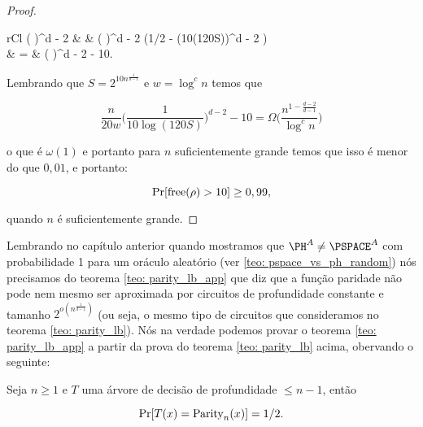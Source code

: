 \begin{proof}
	\begin{IEEEeqnarray*} {rCl}
		 \bigg( \bigg)^{d - 2} & \geq &  \bigg( \bigg)^{d - 2} \bigg(1/2 - (10\log(120S))^{d - 2} \bigg) \\
		                                                                                                                        & =    &  \bigg( \bigg)^{d - 2} - 10.
	\end{IEEEeqnarray*}
	
	Lembrando que $S = 2^{10n^{\frac{1}{d - 1}}}$ e $w = \log^{c}n$ temos que
	
	\begin{equation*}
		\frac{n}{20w} \bigg(\frac{1}{10\log(120S)} \bigg)^{d - 2} - 10 = \Omega \bigg( \frac{n^{1 - \frac{d - 2}{d - 1}}}{\log^{c}n} \bigg)
	\end{equation*}
	
	o que é $\omega(1)$ e portanto para $n$ suficientemente grande temos que isso é menor do que $0,01$, e portanto:
	
	\begin{equation*}
		\Pr[\text{free}(\rho) > 10] \geq 0,99,
	\end{equation*}
	
	quando $n$ é suficientemente grande.
	
\end{proof}

Lembrando no capítulo anterior quando mostramos que $\PH^{A} \neq \PSPACE^{A}$ com probabilidade 1 para um oráculo aleatório (ver \ref{teo: pspace_vs_ph_random}) nós precisamos do teorema \ref{teo: parity_lb_app} que diz que a função paridade não pode nem mesmo ser aproximada por circuitos de profundidade constante e tamanho $2^{o(n^{\frac{1}{d - 1}})}$ (ou seja, o mesmo tipo de circuitos que consideramos no teorema \ref{teo: parity_lb}). Nós na verdade podemos provar o teorema \ref{teo: parity_lb_app} a partir da prova do teorema \ref{teo: parity_lb} acima, obervando o seguinte:

\begin{fato} \label{dt_parity_inapp}

Seja $n \geq 1$ e $T$ uma árvore de decisão de profundidade $\leq n - 1$, então

\begin{equation*}
	\Pr[T(x) = \text{Parity}_{n}(x)] = 1/2.
\end{equation*}

\end{fato}

